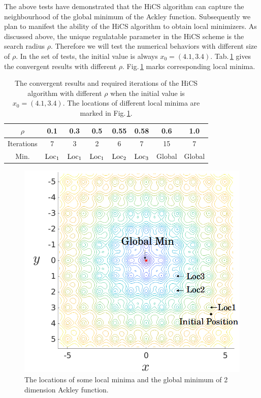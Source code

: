 \documentclass[final,1p,times]{elsarticle}
\begin{document}
The above tests have demonstrated that the HiCS
algorithm can capture the neighbourhood of the global minimum of
the Ackley function. 
Subsequently we plan to manifest the ability of the 
HiCS algorithm to obtain local minimizers.
As discussed above, the unique regulatable parameter in the 
HiCS scheme is the search radius $\rho$. Therefore we
will test the numerical behaviors with different size of $\rho$.
In the set of tests, the initial value is always $x_0=(4.1,3.4)$.
Tab.\,\ref{tab:ackley:r} gives the convergent results with
different $\rho$. Fig.\,\ref{fig:ackley:LG} marks
corresponding local minima.

\begin{table}[!htbp]
\caption{\label{tab:ackley:r}The convergent results and required
iterations of the HiCS algorithm with different
$\rho$ when the
initial value is $x_0=(4.1, 3.4)$. The locations of
different local minima are marked in Fig.\,\ref{fig:ackley:LG}.}
\begin{center}
\begin{tabular}{|c|c|c|c|c|c|c|c|}
 \hline
 $\rho$ & 0.1 & 0.3 & 0.5 & 0.55 & 0.58 &  0.6 & 1.0
 \\\hline
 Iterations & 7   & 3   &  2  & 6 & 7 & 15 & 7
 \\\hline
 Min. & $\rm{Loc_1}$ & $\rm{Loc_1}$ & $\rm{Loc_1}$ & $\rm{Loc_2}$
	& $\rm{Loc_3}$ & Global & Global
 \\\hline
\end{tabular}
\end{center}
\end{table}
\begin{figure}[!htbp]
	\centering
	  \includegraphics[scale=0.28]{../figures/ackley_LG.png}
	  \caption{The locations of some local minima and the global
	  minimum of 2 dimension Ackley function.}
\label{fig:ackley:LG}
\end{figure}
\end{document}
